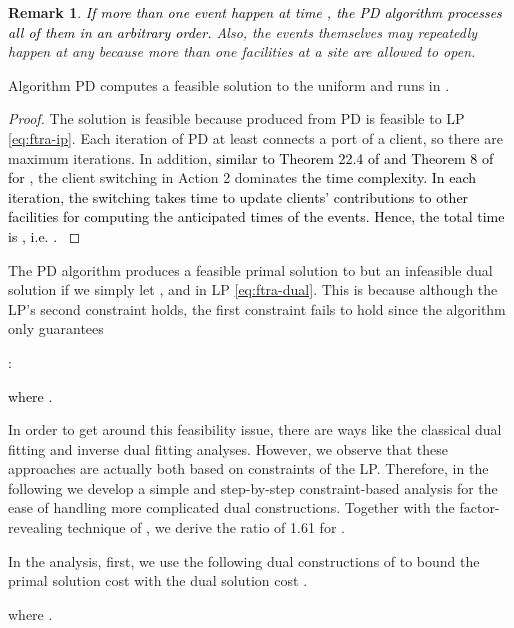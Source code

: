\documentclass[10pt]{llncs}
\newtheorem{rem}{Remark}
\begin{document}
\begin{rem} \textcolor{black}{If more than one event happen at time
, the PD algorithm processes all of them in an arbitrary order.}
Also, the events themselves may repeatedly happen at any  because
more than one facilities at a site are allowed to open.\end{rem}
\begin{lemma}
Algorithm PD computes a feasible solution to the uniform  and
runs in .\label{lem:time-PD}\end{lemma}
\begin{proof}
The solution is feasible because 
produced from PD is feasible to LP \eqref{eq:ftra-ip}. Each iteration
of PD at least connects a port of a client, so there are maximum 
iterations. In addition, \textcolor{black}{similar to Theorem 22.4
of \cite{JensVygenFL06Book} and Theorem 8 of \cite{jain01approximation}
for , }the client switching in Action 2 dominates\textcolor{black}{{}
the time complexity. In each iteration, the switching takes time 
to update clients' contributions to other facilities for computing
the anticipated times of the events. Hence, the total time is ,
i.e. .\medskip{}
}
\end{proof}
The PD algorithm produces a feasible primal solution 
to  but an infeasible dual solution 
if we simply let , 
and  in LP \eqref{eq:ftra-dual}. This is because although
the LP's second constraint holds, the first constraint fails to hold
since the algorithm only guarantees \textcolor{black}{:

where .} In order to get around this
feasibility issue, there are ways like the classical dual fitting
\cite{Jain03dualfitting} and inverse dual fitting \cite{shihongftfa}
analyses. However, we observe that these approaches are actually both
based on constraints of the LP. Therefore, in the following we develop
a simple and step-by-step constraint-based analysis for the ease of
handling more complicated dual constructions. Together with the factor-revealing
technique of \cite{Jain03dualfitting}, we derive the ratio of 1.61
for .

In the analysis, first, we use the following dual constructions of
 to bound the primal solution
cost  with the
dual solution cost .


where .

\medskip{}
\end{document}
